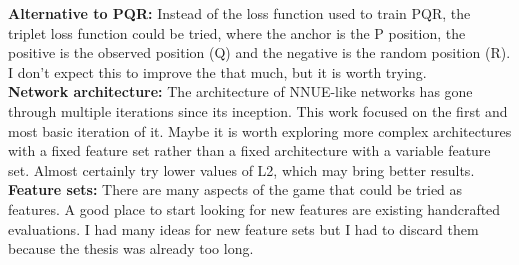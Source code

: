 \textbf{Alternative to PQR:} Instead of the loss function used to train PQR, the triplet loss function could be tried, where the anchor is the P position, the positive is the observed position (Q) and the negative is the random position (R). I don't expect this to improve the that much, but it is worth trying. \\

\textbf{Network architecture:} The architecture of NNUE-like networks has gone through multiple iterations since its inception. This work focused on the first and most basic iteration of it. Maybe it is worth exploring more complex architectures with a fixed feature set rather than a fixed architecture with a variable feature set.
Almost certainly try lower values of L2, which may bring better results. \\

\textbf{Feature sets:} There are many aspects of the game that could be tried as features. A good place to start looking for new features are existing handcrafted evaluations. I had many ideas for new feature sets but I had to discard them because the thesis was already too long.
